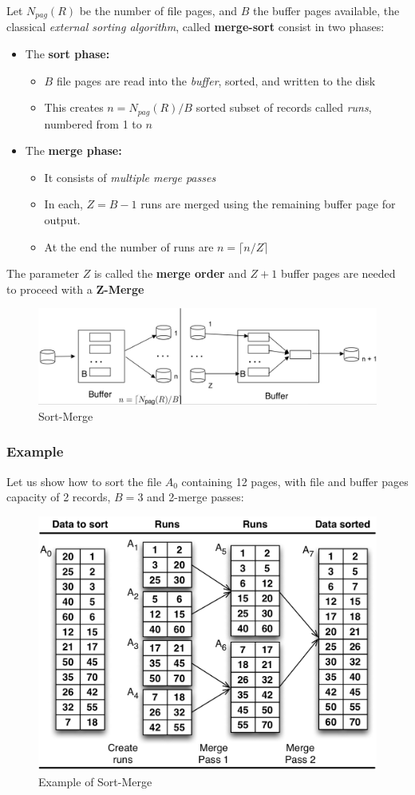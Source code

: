 Let \(N_{pag}(R)\) be the number of file pages, and \(B\) the buffer pages available, the classical \textit{external sorting algorithm}, called \textbf{merge-sort} consist in two phases:
\begin{itemize}
    \item The \textbf{sort phase:}
    \begin{itemize}
        \item \(B\) file pages are read into the \textit{buffer}, sorted, and written to the disk
        \item This creates \(n = N_{pag}(R) / B\) sorted subset of records called \textit{runs}, numbered from 1 to \(n\) 
    \end{itemize}
    \item The \textbf{merge phase:}
    \begin{itemize}
        \item It consists of \textit{multiple merge passes}
        \item In each, \(Z = B - 1\) runs are merged using the remaining buffer page for output.
        \item At the end the number of runs are \(n = \lceil n / Z \rceil\)
    \end{itemize}
\end{itemize}
The parameter \(Z\) is called the \textbf{merge order} and \(Z + 1\) buffer pages are needed to proceed with a \textbf{Z-Merge}

\begin{figure}[!h]
    \centering
    \includegraphics[width=0.7\linewidth]{images/DBMS_Internals/sort_merge.jpeg}
    \caption{Sort-Merge}
\end{figure}


\subsubsection{Example}
Let us show how to sort the file \(A_0\) containing 12 pages, with file and buffer pages capacity of 2 records, \(B = 3\) and 2-merge passes:
\begin{figure}[!h]
    \centering
    \includegraphics[width=0.7\linewidth]{images/DBMS_Internals/example_sort_merge.jpeg}
    \caption{Example of Sort-Merge}
\end{figure}

